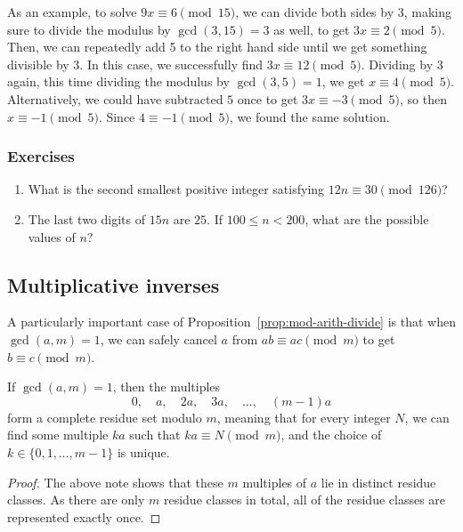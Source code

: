 As an example, to solve $9x\equiv 6\pmod{15}$, we can divide both sides by $3$, making sure to divide the modulus by $\gcd(3,15) = 3$ as well, to get $3x\equiv 2\pmod{5}$. Then, we can repeatedly add 5 to the right hand side until we get something divisible by 3. In this case, we successfully find $3x\equiv 12\pmod{5}$. Dividing by 3 again, this time dividing the modulus by $\gcd(3,5) = 1$, we get $x\equiv 4\pmod{5}$. Alternatively, we could have subtracted $5$ once to get $3x\equiv -3\pmod{5}$, so then $x\equiv -1\pmod{5}$. Since $4\equiv -1\pmod{5}$, we found the same solution.

\subsubsection*{Exercises}

\begin{enumerate}
\item What is the second smallest positive integer satisfying $12n\equiv 30\pmod{126}$?
\item The last two digits of $15n$ are $25$. If $100\leq n < 200$, what are the possible values of $n$?
\end{enumerate}


\subsection{Multiplicative inverses}

A particularly important case of Proposition~\ref{prop:mod-arith-divide} is that when $\gcd(a,m) = 1$, we can safely cancel $a$ from $ab\equiv ac\pmod{m}$ to get $b\equiv c\pmod{m}$.

\begin{theorem}\label{thm:complete-residue-set}
If $\gcd(a,m) = 1$, then the multiples
\begin{equation*}
0,\quad a,\quad 2a,\quad 3a,\quad \ldots,\quad (m - 1)a
\end{equation*}
form a complete residue set modulo $m$, meaning that for every integer $N$, we can find some multiple $ka$ such that $ka\equiv N\pmod{m}$, and the choice of $k\in\{0, 1, \ldots, m - 1\}$ is unique.
\end{theorem}
\begin{proof}
The above note shows that these $m$ multiples of $a$ lie in distinct residue classes. As there are only $m$ residue classes in total, all of the residue classes are represented exactly once.
\end{proof}

